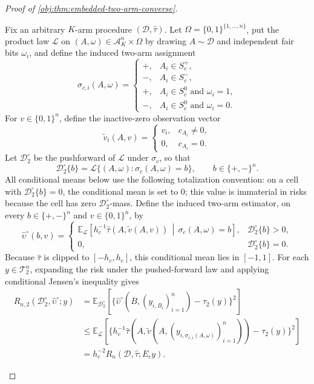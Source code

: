 \documentclass[11pt]{article}
\begin{document}
\begin{proof}[Proof of \cref{obj:thm:embedded-two-arm-converse}]
\begin{enumerate}
Fix an arbitrary \(K\)-arm procedure \((\mathcal D,\widehat\tau)\). Let
\(\Omega=\{0,1\}^{\{1,\ldots,n\}}\), put the product law \(\mathcal L\) on
\((A,\omega)\in\mathcal A_K^n\times\Omega\) by drawing \(A\sim\mathcal D\) and independent fair bits
\(\omega_i\), and define the induced two-arm assignment
\[
\sigma_{c,i}(A,\omega)
=
\begin{cases}
+,&A_i\in S_c^+,\\
-,&A_i\in S_c^-,\\
+,&A_i\in S_c^0\text{ and }\omega_i=1,\\
-,&A_i\in S_c^0\text{ and }\omega_i=0.
\end{cases}
\]
For \(v\in\{0,1\}^n\), define the inactive-zero observation vector
\[
\widetilde v_i(A,v)
=
\begin{cases}
v_i,&c_{A_i}\ne0,\\
0,&c_{A_i}=0.
\end{cases}
\]
Let \(\mathcal D_2^\circ\) be the pushforward of \(\mathcal L\) under \(\sigma_c\), so that
\[
\mathcal D_2^\circ\{b\}
=
\mathcal L\{(A,\omega):\sigma_c(A,\omega)=b\},
\qquad b\in\{+,-\}^n.
\]
All conditional means below use the following totalization convention: on a cell with
\(\mathcal D_2^\circ\{b\}=0\), the conditional mean is set to \(0\); this value is immaterial in risks because the cell has zero \(\mathcal D_2^\circ\)-mass. Define the induced two-arm estimator, on every \(b\in\{+,-\}^n\) and \(v\in\{0,1\}^n\), by
\[
\widehat\upsilon^\circ(b,v)
=
\begin{cases}
\mathbb E_{\mathcal L}\!\left[
h_c^{-1}\widehat\tau(A,\widetilde v(A,v))
\,\middle|\, \sigma_c(A,\omega)=b
\right],&\mathcal D_2^\circ\{b\}>0,\\[1ex]
0,&\mathcal D_2^\circ\{b\}=0.
\end{cases}
\]
Because \(\widehat\tau\) is clipped to \([-h_c,h_c]\), this conditional mean lies in \([-1,1]\). For each \(y\in\mathcal T_2^n\), expanding the risk under the pushed-forward law and applying conditional Jensen's inequality gives
\[
\begin{aligned}
R_{n,2}(\mathcal D_2^\circ,\widehat\upsilon^\circ;y)
&=
\mathbb E_{\mathcal D_2^\circ}\!\left[
\{\widehat\upsilon^\circ(B,(y_{i,B_i})_{i=1}^n)-\tau_2(y)\}^2
\right]\\
&\le
\mathbb E_{\mathcal L}\!\left[
\{h_c^{-1}\widehat\tau(A,\widetilde v(A,(y_{i,\sigma_{c,i}(A,\omega)})_{i=1}^n))-\tau_2(y)\}^2
\right] \\
&=
h_c^{-2}
R_n(\mathcal D,\widehat\tau;E_cy).
\end{aligned}
\]
\end{enumerate}
\end{proof}
\end{document}

